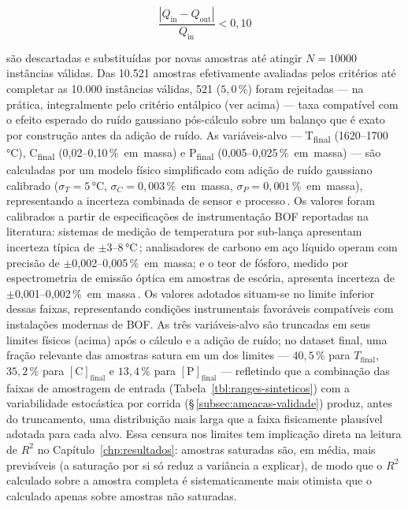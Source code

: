 \begin{equation}
\frac{|Q_\text{in} - Q_\text{out}|}{Q_\text{in}} < 0{,}10 \label{eq:criterio-entalpico}
\end{equation}

\noindent são descartadas e substituídas por novas amostras até atingir $N = 10000$ instâncias válidas. Das 10.521 amostras efetivamente avaliadas pelos critérios até completar as 10.000 instâncias válidas, 521 ($5{,}0\,\%$) foram rejeitadas — na prática, integralmente pelo critério entálpico (ver acima) — taxa compatível com o efeito esperado do ruído gaussiano pós-cálculo sobre um balanço que é exato por construção antes da adição de ruído. As variáveis-alvo — T\textsubscript{final} (1620–1700\,°C), C\textsubscript{final} (0{,}02–0{,}10\,\%~em~massa) e P\textsubscript{final} (0{,}005–0{,}025\,\%~em~massa) — são calculadas por um modelo físico simplificado com adição de ruído gaussiano calibrado ($\sigma_T = 5$\,°C, $\sigma_C = 0{,}003$\,\%~em~massa, $\sigma_P = 0{,}001$\,\%~em~massa), representando a incerteza combinada de sensor e processo\,\cite{xia2024dmpinn,bae2020bof}. Os valores foram calibrados a partir de especificações de instrumentação BOF reportadas na literatura: sistemas de medição de temperatura por sub-lança apresentam incerteza típica de $\pm$3–8\,°C\,\cite{chattopadhyay2022hybrid,zhou2024bof}; analisadores de carbono em aço líquido operam com precisão de $\pm$0{,}002–0{,}005\,\%~em~massa; e o teor de fósforo, medido por espectrometria de emissão óptica em amostras de escória, apresenta incerteza de $\pm$0{,}001–0{,}002\,\%~em~massa\,\cite{bae2020bof,chattopadhyay2022hybrid}. Os valores adotados situam-se no limite inferior dessas faixas, representando condições instrumentais favoráveis compatíveis com instalações modernas de BOF. As três variáveis-alvo são truncadas em seus limites físicos (acima) após o cálculo e a adição de ruído; no dataset final, uma fração relevante das amostras satura em um dos limites --- $40{,}5\,\%$ para $T_\text{final}$, $35{,}2\,\%$ para $[\text{C}]_\text{final}$ e $13{,}4\,\%$ para $[\text{P}]_\text{final}$ --- refletindo que a combinação das faixas de amostragem de entrada (Tabela~\ref{tbl:ranges-sinteticos}) com a variabilidade estocástica por corrida (§\,\ref{subsec:ameacas-validade}) produz, antes do truncamento, uma distribuição mais larga que a faixa fisicamente plausível adotada para cada alvo. Essa censura nos limites tem implicação direta na leitura de $R^2$ no Capítulo~\ref{chp:resultados}: amostras saturadas são, em média, mais previsíveis (a saturação por si só reduz a variância a explicar), de modo que o $R^2$ calculado sobre a amostra completa é sistematicamente mais otimista que o calculado apenas sobre amostras não saturadas.


